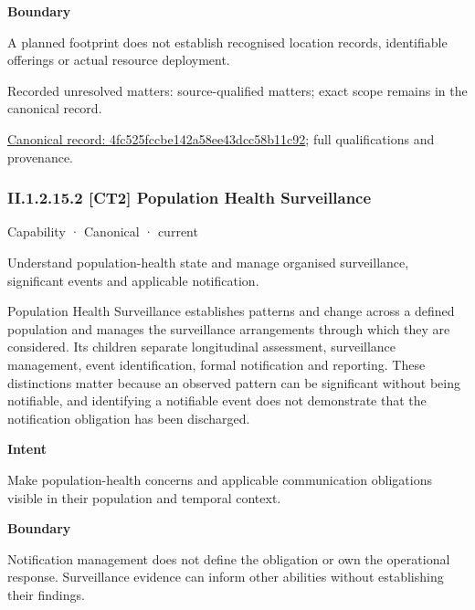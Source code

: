 \textbf{Boundary}



A planned footprint does not establish recognised location records, identifiable offerings or actual resource deployment.


{\small Recorded unresolved matters: source-qualified matters; exact scope remains in the canonical record.}\par
{\footnotesize \href{../../../../continuum/strategy/capability/4fc525fccbe142a58ee43dcc58b11c92.md}{Canonical record: 4fc525fccbe142a58ee43dcc58b11c92}; full qualifications and provenance.}\par
\subsubsection*{II.1.2.15.2 [CT2] Population Health Surveillance}
\label{navigation:II.1.2.15.2}

\label{element:83e568fa8af14d7791a7253765ea390f}
{\small Capability · Canonical · current}\par

Understand population-health state and manage organised surveillance, significant events and applicable notification.



Population Health Surveillance establishes patterns and change across a defined population and manages the surveillance arrangements through which they are considered. Its children separate longitudinal assessment, surveillance management, event identification, formal notification and reporting. These distinctions matter because an observed pattern can be significant without being notifiable, and identifying a notifiable event does not demonstrate that the notification obligation has been discharged.



\textbf{Intent}



Make population-health concerns and applicable communication obligations visible in their population and temporal context.



\textbf{Boundary}



Notification management does not define the obligation or own the operational response. Surveillance evidence can inform other abilities without establishing their findings.


